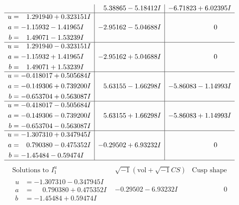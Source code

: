 \documentclass[1p]{elsarticle_modified}
\theoremstyle{definition}
\newcommand{\I}{\sqrt{-1}}
\begin{document}
$$\begin{array}{c|c|c}
 & \phantom{-}5.38865 - 5.18412 I & -6.71823 + 6.02395 I \\ \hline\begin{aligned}
u &= \phantom{-}1.291940 + 0.323151 I \\
a &= -1.15932 - 1.41965 I \\
b &= \phantom{-}1.49071 - 1.53239 I\end{aligned}
 & -2.95162 - 5.04688 I & \phantom{-0.000000 } 0 \\ \hline\begin{aligned}
u &= \phantom{-}1.291940 - 0.323151 I \\
a &= -1.15932 + 1.41965 I \\
b &= \phantom{-}1.49071 + 1.53239 I\end{aligned}
 & -2.95162 + 5.04688 I & \phantom{-0.000000 } 0 \\ \hline\begin{aligned}
u &= -0.418017 + 0.505684 I \\
a &= -0.149306 + 0.739200 I \\
b &= -0.653704 + 0.563087 I\end{aligned}
 & \phantom{-}5.63155 - 1.66298 I & -5.86083 - 1.14993 I \\ \hline\begin{aligned}
u &= -0.418017 - 0.505684 I \\
a &= -0.149306 - 0.739200 I \\
b &= -0.653704 - 0.563087 I\end{aligned}
 & \phantom{-}5.63155 + 1.66298 I & -5.86083 + 1.14993 I \\ \hline\begin{aligned}
u &= -1.307310 + 0.347945 I \\
a &= \phantom{-}0.790380 - 0.475352 I \\
b &= -1.45484 - 0.59474 I\end{aligned}
 & -0.29502 + 6.93232 I & \phantom{-0.000000 } 0\\
 \hline 
 \end{array}$$\newpage$$\begin{array}{c|c|c}  
\text{Solutions to }I^u_{1}& \I (\text{vol} + \sqrt{-1}CS) & \text{Cusp shape}\\
 \hline 
\begin{aligned}
u &= -1.307310 - 0.347945 I \\
a &= \phantom{-}0.790380 + 0.475352 I \\
b &= -1.45484 + 0.59474 I\end{aligned}
 & -0.29502 - 6.93232 I & \phantom{-0.000000 } 0 \\ \hline\begin{aligned}

\end{aligned}
\end{array}$$
\end{document}
